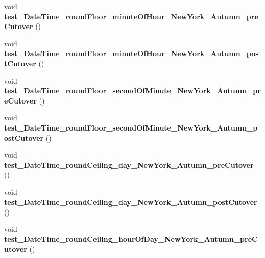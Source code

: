 \begin{DoxyCompactItemize}
\item 
\hypertarget{classorg_1_1joda_1_1time_1_1_test_date_time_zone_cutover_a4d57d378111f6efdb8594736b1fe261a}{void {\bfseries test\-\_\-\-Date\-Time\-\_\-round\-Floor\-\_\-minute\-Of\-Hour\-\_\-\-New\-York\-\_\-\-Autumn\-\_\-pre\-Cutover} ()}\label{classorg_1_1joda_1_1time_1_1_test_date_time_zone_cutover_a4d57d378111f6efdb8594736b1fe261a}

\item 
\hypertarget{classorg_1_1joda_1_1time_1_1_test_date_time_zone_cutover_a3900bd4d1d3d9c672fc3466f2fe68c36}{void {\bfseries test\-\_\-\-Date\-Time\-\_\-round\-Floor\-\_\-minute\-Of\-Hour\-\_\-\-New\-York\-\_\-\-Autumn\-\_\-post\-Cutover} ()}\label{classorg_1_1joda_1_1time_1_1_test_date_time_zone_cutover_a3900bd4d1d3d9c672fc3466f2fe68c36}

\item 
\hypertarget{classorg_1_1joda_1_1time_1_1_test_date_time_zone_cutover_a30c5a72f72cfd9ac27f042301fd52c4a}{void {\bfseries test\-\_\-\-Date\-Time\-\_\-round\-Floor\-\_\-second\-Of\-Minute\-\_\-\-New\-York\-\_\-\-Autumn\-\_\-pre\-Cutover} ()}\label{classorg_1_1joda_1_1time_1_1_test_date_time_zone_cutover_a30c5a72f72cfd9ac27f042301fd52c4a}

\item 
\hypertarget{classorg_1_1joda_1_1time_1_1_test_date_time_zone_cutover_a9a557742b3de9a1f623f393ad2c7d8e4}{void {\bfseries test\-\_\-\-Date\-Time\-\_\-round\-Floor\-\_\-second\-Of\-Minute\-\_\-\-New\-York\-\_\-\-Autumn\-\_\-post\-Cutover} ()}\label{classorg_1_1joda_1_1time_1_1_test_date_time_zone_cutover_a9a557742b3de9a1f623f393ad2c7d8e4}

\item 
\hypertarget{classorg_1_1joda_1_1time_1_1_test_date_time_zone_cutover_adff799477369052c6847846d71c97742}{void {\bfseries test\-\_\-\-Date\-Time\-\_\-round\-Ceiling\-\_\-day\-\_\-\-New\-York\-\_\-\-Autumn\-\_\-pre\-Cutover} ()}\label{classorg_1_1joda_1_1time_1_1_test_date_time_zone_cutover_adff799477369052c6847846d71c97742}

\item 
\hypertarget{classorg_1_1joda_1_1time_1_1_test_date_time_zone_cutover_aec6cc30a8431f0624bb7d322a8555d36}{void {\bfseries test\-\_\-\-Date\-Time\-\_\-round\-Ceiling\-\_\-day\-\_\-\-New\-York\-\_\-\-Autumn\-\_\-post\-Cutover} ()}\label{classorg_1_1joda_1_1time_1_1_test_date_time_zone_cutover_aec6cc30a8431f0624bb7d322a8555d36}

\item 
\hypertarget{classorg_1_1joda_1_1time_1_1_test_date_time_zone_cutover_aa42f7c791fd626e7ceb8f0f51e2f1d52}{void {\bfseries test\-\_\-\-Date\-Time\-\_\-round\-Ceiling\-\_\-hour\-Of\-Day\-\_\-\-New\-York\-\_\-\-Autumn\-\_\-pre\-Cutover} ()}\label{classorg_1_1joda_1_1time_1_1_test_date_time_zone_cutover_aa42f7c791fd626e7ceb8f0f51e2f1d52}


\end{DoxyCompactItemize}
